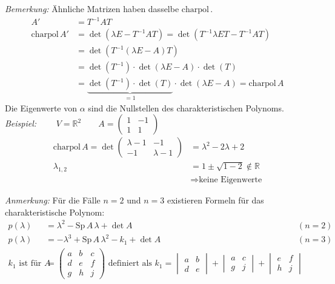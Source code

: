 \documentclass[%
a4paper,
11pt,		%
]
{scrartcl}
\newcommand{\R}{\mathbb{R}}
\newcommand{\Sp}{\text{Sp}\,}
\newcommand{\charpol}{\text{charpol}\,}
\theoremstyle{plain}
\theoremstyle{plain}
\theoremstyle{plain}
\theoremstyle{plain}
\theoremstyle{plain}
\begin{document}
\textit{Bemerkung:} Ähnliche Matrizen haben dasselbe $\charpol$.
\begin{align*}
    A' & = T^{-1}AT\\
    \charpol A' & = \det(\lambda E - T^{-1}AT) = \det(T^{-1}\lambda ET - T^{-1}AT)\\
    & = \det( T^{-1}(\lambda E - A) T )\\
    & = \det( T^{-1}) \cdot \det(\lambda E - A) \cdot  \det(T)\\
    & = \underbrace{\det( T^{-1}) \cdot \det(T)}_{=1} \cdot \det(\lambda E - A) = \charpol A
\end{align*}
Die Eigenwerte von $\alpha$ sind die Nullstellen des charakteristischen Polynoms.\\

\textit{Beispiel:} $\qquad V=\R^2 \qquad A = \begin{pmatrix}
    1 & -1\\
    1 & 1
\end{pmatrix}$
\begin{align*}
    \charpol A = \det
    \begin{pmatrix}
        \lambda - 1 & -1\\
        -1 & \lambda - 1
    \end{pmatrix}
    & = \lambda^2 -2 \lambda + 2\\
    \lambda_{1,2} & = 1 \pm \sqrt{1-2} \notin \R\\
    & \Rightarrow \text{keine Eigenwerte}
\end{align*}

\textit{Anmerkung:}
Für die Fälle $n=2$ und $n=3$ existieren Formeln für das charakteristische Polynom:
\begin{align*}
    p(\lambda) & = \lambda^2 - \Sp A\, \lambda  + \det A & (n=2)\\
    p(\lambda) & = -\lambda^3 + \Sp A\, \lambda^2 - k_1 + \det A & (n=3)\\
    k_1 \text{ ist für } A & = 
    \begin{pmatrix}
        a & b & c\\
        d & e & f\\
        g & h & j
    \end{pmatrix}
    \text{ definiert als }
    k_1 = 
    \begin{vmatrix}
        a & b\\
        d & e
    \end{vmatrix}
    +
    \begin{vmatrix}
        a & c\\
        g & j
    \end{vmatrix}
    +
    \begin{vmatrix}
        e & f\\
        h & j
    \end{vmatrix}
\end{align*}
\end{document}
